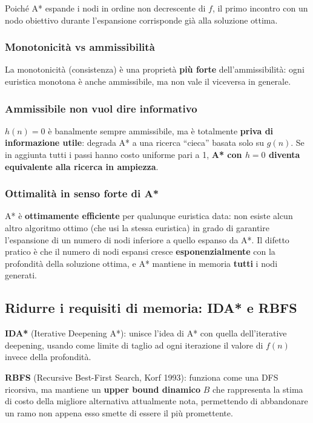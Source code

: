 \documentclass[11pt,a4paper]{report}
\begin{document}
Poiché A* espande i nodi in ordine non decrescente di $f$, il primo incontro con un nodo obiettivo durante l'espansione corrisponde già alla soluzione ottima.

\subsubsection*{Monotonicità vs ammissibilità}

La monotonicità (consistenza) è una proprietà \textbf{più forte} dell'ammissibilità: ogni euristica monotona è anche ammissibile, ma non vale il viceversa in generale.

\subsubsection*{Ammissibile non vuol dire informativo}

$h(n)=0$ è banalmente sempre ammissibile, ma è totalmente \textbf{priva di informazione utile}: degrada A* a una ricerca ``cieca'' basata solo su $g(n)$. Se in aggiunta tutti i passi hanno costo uniforme pari a 1, \textbf{A* con $h=0$ diventa equivalente alla ricerca in ampiezza}.

\subsubsection*{Ottimalità in senso forte di A*}

A* è \textbf{ottimamente efficiente} per qualunque euristica data: non esiste alcun altro algoritmo ottimo (che usi la stessa euristica) in grado di garantire l'espansione di un numero di nodi inferiore a quello espanso da A*. Il difetto pratico è che il numero di nodi espansi cresce \textbf{esponenzialmente} con la profondità della soluzione ottima, e A* mantiene in memoria \textbf{tutti} i nodi generati.

\subsection{Ridurre i requisiti di memoria: IDA* e RBFS}

\textbf{IDA*} (Iterative Deepening A*): unisce l'idea di A* con quella dell'iterative deepening, usando come limite di taglio ad ogni iterazione il valore di $f(n)$ invece della profondità.

\textbf{RBFS} (Recursive Best-First Search, Korf 1993): funziona come una DFS ricorsiva, ma mantiene un \textbf{upper bound dinamico} $B$ che rappresenta la stima di costo della migliore alternativa attualmente nota, permettendo di abbandonare un ramo non appena esso smette di essere il più promettente.
\end{document}
